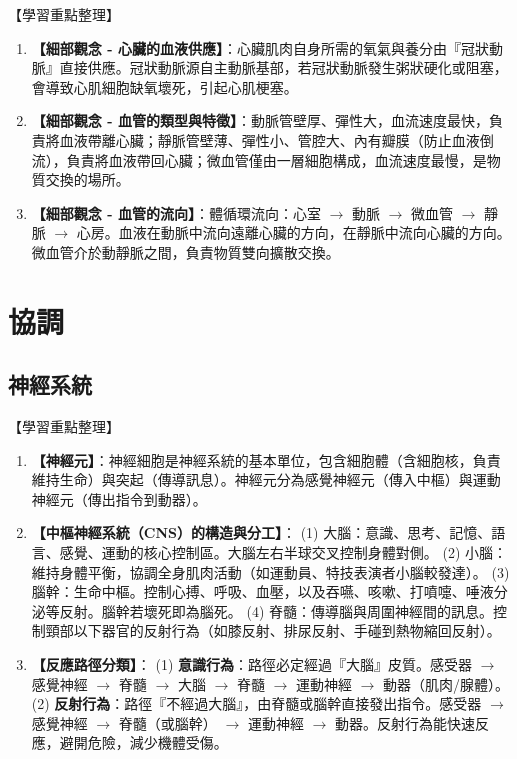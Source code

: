 \documentclass[11pt,a4paper]{article}
\begin{document}
\begin{learningpoints}{【學習重點整理】}
\begin{enumerate}[label=\arabic*.]
  \item \textbf{【細部觀念 - 心臟的血液供應】}：心臟肌肉自身所需的氧氣與養分由『冠狀動脈』直接供應。冠狀動脈源自主動脈基部，若冠狀動脈發生粥狀硬化或阻塞，會導致心肌細胞缺氧壞死，引起心肌梗塞。
  \item \textbf{【細部觀念 - 血管的類型與特徵】}：動脈管壁厚、彈性大，血流速度最快，負責將血液帶離心臟；靜脈管壁薄、彈性小、管腔大、內有瓣膜（防止血液倒流），負責將血液帶回心臟；微血管僅由一層細胞構成，血流速度最慢，是物質交換的場所。
  \item \textbf{【細部觀念 - 血管的流向】}：體循環流向：心室 $\rightarrow$ 動脈 $\rightarrow$ 微血管 $\rightarrow$ 靜脈 $\rightarrow$ 心房。血液在動脈中流向遠離心臟的方向，在靜脈中流向心臟的方向。微血管介於動靜脈之間，負責物質雙向擴散交換。
\end{enumerate}
\end{learningpoints}

\newpage
\section{協調}
\subsection{神經系統}
\begin{learningpoints}{【學習重點整理】}
\begin{enumerate}[label=\arabic*.]
  \item \textbf{【神經元】}：神經細胞是神經系統的基本單位，包含細胞體（含細胞核，負責維持生命）與突起（傳導訊息）。神經元分為感覺神經元（傳入中樞）與運動神經元（傳出指令到動器）。
  \item \textbf{【中樞神經系統（CNS）的構造與分工】}：
  (1) 大腦：意識、思考、記憶、語言、感覺、運動的核心控制區。大腦左右半球交叉控制身體對側。
  (2) 小腦：維持身體平衡，協調全身肌肉活動（如運動員、特技表演者小腦較發達）。
  (3) 腦幹：生命中樞。控制心搏、呼吸、血壓，以及吞嚥、咳嗽、打噴嚏、唾液分泌等反射。腦幹若壞死即為腦死。
  (4) 脊髓：傳導腦與周圍神經間的訊息。控制頸部以下器官的反射行為（如膝反射、排尿反射、手碰到熱物縮回反射）。
  \item \textbf{【反應路徑分類】}：
  (1) \textbf{意識行為}：路徑必定經過『大腦』皮質。感受器 $\rightarrow$ 感覺神經 $\rightarrow$ 脊髓 $\rightarrow$ 大腦 $\rightarrow$ 脊髓 $\rightarrow$ 運動神經 $\rightarrow$ 動器（肌肉/腺體）。
  (2) \textbf{反射行為}：路徑『不經過大腦』，由脊髓或腦幹直接發出指令。感受器 $\rightarrow$ 感覺神經 $\rightarrow$ 脊髓（或腦幹） $\rightarrow$ 運動神經 $\rightarrow$ 動器。反射行為能快速反應，避開危險，減少機體受傷。
\end{enumerate}
\end{learningpoints}
\end{document}
